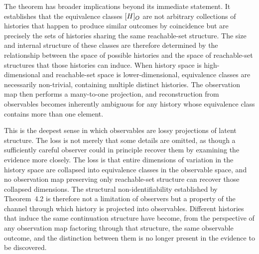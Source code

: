 The theorem has broader implications beyond its immediate statement. It establishes that the equivalence classes $[H]_{O}$ are not arbitrary collections of histories that happen to produce similar outcomes by coincidence but are precisely the sets of histories sharing the same reachable-set structure. The size and internal structure of these classes are therefore determined by the relationship between the space of possible histories and the space of reachable-set structures that those histories can induce. When history space is high-dimensional and reachable-set space is lower-dimensional, equivalence classes are necessarily non-trivial, containing multiple distinct histories. The observation map then performs a many-to-one projection, and reconstruction from observables becomes inherently ambiguous for any history whose equivalence class contains more than one element.

This is the deepest sense in which observables are lossy projections of latent structure. The loss is not merely that some details are omitted, as though a sufficiently careful observer could in principle recover them by examining the evidence more closely. The loss is that entire dimensions of variation in the history space are collapsed into equivalence classes in the observable space, and no observation map preserving only reachable-set structure can recover those collapsed dimensions. The structural non-identifiability established by Theorem~4.2 is therefore not a limitation of observers but a property of the channel through which history is projected into observables. Different histories that induce the same continuation structure have become, from the perspective of any observation map factoring through that structure, the same observable outcome, and the distinction between them is no longer present in the evidence to be discovered.
